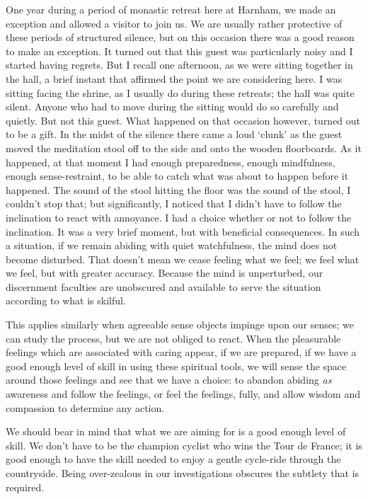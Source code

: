 One year during a period of monastic retreat here at Harnham, we made an
exception and allowed a visitor to join us. We are usually rather
protective of these periods of structured silence, but on this occasion
there was a good reason to make an exception. It turned out that this
guest was particularly noisy and I started having regrets. But I recall
one afternoon, as we were sitting together in the hall, a brief instant
that affirmed the point we are considering here. I was sitting facing
the shrine, as I usually do during these retreats; the hall was quite
silent. Anyone who had to move during the sitting would do so carefully
and quietly. But not this guest. What happened on that occasion however,
turned out to be a gift. In the midst of the silence there came a loud
‘clunk’ as the guest moved the meditation stool off to the side and onto
the wooden floorboards. As it happened, at that moment I had enough
preparedness, enough mindfulness, enough sense-restraint, to be able to
catch what was about to happen before it happened. The sound of the
stool hitting the floor was the sound of the stool, I couldn’t stop
that; but significantly, I noticed that I didn’t have to follow the
inclination to react with annoyance. I had a choice whether or not to
follow the inclination. It was a very brief moment, but with beneficial
consequences. In such a situation, if we remain abiding with quiet
watchfulness, the mind does not become disturbed. That doesn’t mean we
cease feeling what we feel; we feel what we feel, but with greater
accuracy. Because the mind is unperturbed, our discernment faculties are
unobscured and available to serve the situation according to what is
skilful.

This applies similarly when agreeable sense objects impinge upon our
senses; we can study the process, but we are not obliged to react. When
the pleasurable feelings which are associated with caring appear, if we
are prepared, if we have a good enough level of skill in using these
spiritual tools, we will sense the space around those feelings and see
that we have a choice: to abandon abiding \emph{as} awareness and follow the
feelings, or feel the feelings, fully, and allow wisdom and compassion
to determine any action.

\enlargethispage*{\baselineskip}

We should bear in mind that what we are aiming for is a good enough
level of skill. We don’t have to be the champion cyclist who wins the
Tour de France; it is good enough to have the skill needed to enjoy a
gentle cycle-ride through the countryside. Being over-zealous in our
investigations obscures the subtlety that is required.

